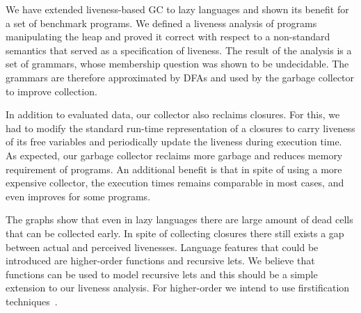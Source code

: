 \documentclass[9pt,preprint,letter,nonatbib]{sigplanconf}
\begin{document}

We have  extended liveness-based  GC  to lazy
  languages  and shown  its benefit  for a  set of  benchmark
  programs.  We  defined a liveness analysis  of programs manipulating
  the  heap and  proved  it  correct with  respect  to a  non-standard
  semantics that served as a specification of liveness.  The result of
  the analysis  is a  set of grammars,  whose membership  question was
  shown to be undecidable. The  grammars are therefore approximated by
  DFAs and used by the garbage collector to improve collection.

In addition to  evaluated data, our collector  also reclaims closures.
For this, we  had to modify the standard run-time  representation of a
closures  to carry  liveness  of its free  variables and  periodically
update the liveness during execution  time.  As expected, our garbage
collector  reclaims more  garbage and  reduces memory  requirement of
programs.  An  additional benefit is  that in  spite of using  a more
expensive collector, the execution times remains comparable in
most cases, and even improves for some programs.


The graphs show that even in lazy languages there are large amount of
dead cells that can be collected early. In spite of collecting
closures there still exists a gap between actual and perceived
livenesses.  Language features that could be introduced are
higher-order functions and recursive lets. We believe that functions
can be used to model recursive lets and this should be a simple
extension to our liveness analysis.  For higher-order we intend to use
firstification techniques~\cite{Mitchell:2009}.
 
\end{document}
